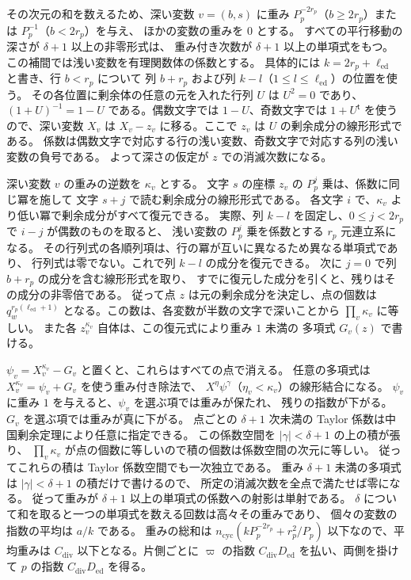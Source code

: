 その次元の和を数えるため、深い変数 \(v=(b,s)\) に重み
\(P_p^{-2r_p}\)（\(b\ge2r_p\)）または \(P_p^{-1}\)（\(b<2r_p\)）を与え、
ほかの変数の重みを \(0\) とする。
すべての平行移動の深さが \(\delta+1\) 以上の非零形式は、
重み付き次数が \(\delta+1\) 以上の単項式をもつ。
この補間では浅い変数を有理関数体の係数とする。
具体的には \(k=2r_p+\ell_\mathrm{ed}\) と書き、行 \(b<r_p\) について
列 \(b+r_p\) および列 \(k-l\)（\(1\le l\le\ell_\mathrm{ed}\)）の位置を使う。
その各位置に剰余体の任意の元を入れた行列 \(U\) は \(U^2=0\) であり、
\((1+U)^{-1}=1-U\) である。偶数文字では \(1-U\)、奇数文字では
\(1+U^{\mathsf t}\) を使うので、深い変数 \(X_v\) は
\(X_v-z_v\) に移る。ここで \(z_v\) は \(U\) の剰余成分の線形形式である。
係数は偶数文字で対応する行の浅い変数、奇数文字で対応する列の浅い変数の負号である。
よって深さの仮定が \(z\) での消滅次数になる。

深い変数 \(v\) の重みの逆数を \(\kappa_v\) とする。
文字 \(s\) の座標 \(z_v\) の \(P_p^j\) 乗は、係数に同じ冪を施して
文字 \(s+j\) で読む剰余成分の線形形式である。
各文字 \(i\) で、\(\kappa_v\) より低い冪で剰余成分がすべて復元できる。
実際、列 \(k-l\) を固定し、\(0\le j<2r_p\) で \(i-j\) が偶数のものを取ると、
浅い変数の \(P_p^j\) 乗を係数とする \(r_p\) 元連立系になる。
その行列式の各順列項は、行の冪が互いに異なるため異なる単項式であり、
行列式は零でない。これで列 \(k-l\) の成分を復元できる。
次に \(j=0\) で列 \(b+r_p\) の成分を含む線形形式を取り、
すでに復元した成分を引くと、残りはその成分の非零倍である。
従って点 \(z\) は元の剰余成分を決定し、点の個数は \(q_w^{r_p(\ell_\mathrm{ed}+1)}\)
となる。この数は、各変数が半数の文字で深いことから
\(\prod_v\kappa_v\) に等しい。
また各 \(z_v^{\kappa_v}\) 自体は、この復元式により重み \(1\) 未満の
多項式 \(G_v(z)\) で書ける。

\(\psi_v=X_v^{\kappa_v}-G_v\) と置くと、これらはすべての点で消える。
任意の多項式は \(X_v^{\kappa_v}=\psi_v+G_v\) を使う重み付き除法で、
\(X^\eta\psi^\gamma\)（\(\eta_v<\kappa_v\)）の線形結合になる。
\(\psi_v\) に重み \(1\) を与えると、\(\psi_v\) を選ぶ項では重みが保たれ、
残りの指数が下がる。\(G_v\) を選ぶ項では重みが真に下がる。
点ごとの \(\delta+1\) 次未満の Taylor 係数は中国剰余定理により任意に指定できる。
この係数空間を \(|\gamma|<\delta+1\) の上の積が張り、
\(\prod_v\kappa_v\) が点の個数に等しいので積の個数は係数空間の次元に等しい。
従ってこれらの積は Taylor 係数空間でも一次独立である。
重み \(\delta+1\) 未満の多項式は \(|\gamma|<\delta+1\) の積だけで書けるので、
所定の消滅次数を全点で満たせば零になる。
従って重みが \(\delta+1\) 以上の単項式の係数への射影は単射である。
\(\delta\) について和を取ると一つの単項式を数える回数は高々その重みであり、
個々の変数の指数の平均は \(a/k\) である。
重みの総和は
\(n_\mathrm{cyc}(kP_p^{-2r_p}+r_p^2/P_p)\) 以下なので、平均重みは
\(C_{\mathrm{div}}\) 以下となる。片側ごとに \(\varpi\) の指数
\(C_{\mathrm{div}}D_\mathrm{ed}\) を払い、両側を掛けて \(p\) の指数
\(C_{\mathrm{div}}D_\mathrm{ed}\) を得る。

